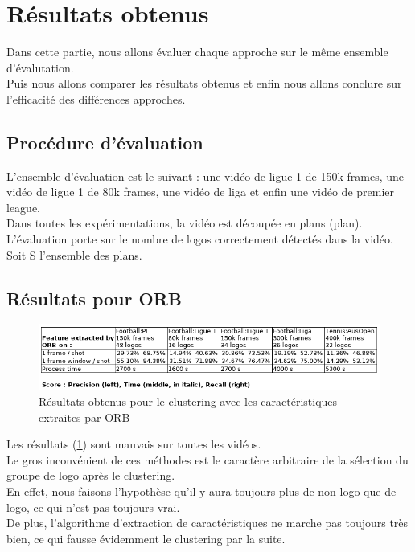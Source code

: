 \documentclass[11pt]{article}
\begin{document}
\section{Résultats obtenus}
\label{sec:orgef98d17}
Dans cette partie, nous allons évaluer chaque approche sur le même ensemble d'évalutation.\\
Puis nous allons comparer les résultats obtenus et enfin nous allons conclure sur l'efficacité des différences approches.\\

\subsection{Procédure d'évaluation}
\label{sec:org510929e}
L'ensemble d'évaluation est le suivant : une vidéo de ligue 1 de 150k frames, une vidéo de ligue 1 de 80k frames, une vidéo de liga et enfin une vidéo de premier league.\\
Dans toutes les expérimentations, la vidéo est découpée en plans (plan). L'évaluation porte sur le nombre de logos correctement détectés dans la vidéo.\\
Soit S l'ensemble des plans.\\

\subsection{Résultats pour ORB}
\label{sec:orgefa1a95}
\begin{figure}[htbp]
\centering
\includegraphics[width=15cm]{res_orb.png}
\caption{Résultats obtenus pour le clustering avec les caractéristiques extraites par ORB \label{orb-res}}
\end{figure}

Les résultats (\ref{orb-res}) sont mauvais sur toutes les vidéos.\\
Le gros inconvénient de ces méthodes est le caractère arbitraire de la sélection du groupe de logo après le clustering.\\
En effet, nous faisons l'hypothèse qu'il y aura toujours plus de non-logo que de logo, ce qui n'est pas toujours vrai.\\
De plus, l'algorithme d'extraction de caractéristiques ne marche pas toujours très bien, ce qui fausse évidemment le clustering par la suite.\\
\end{document}
